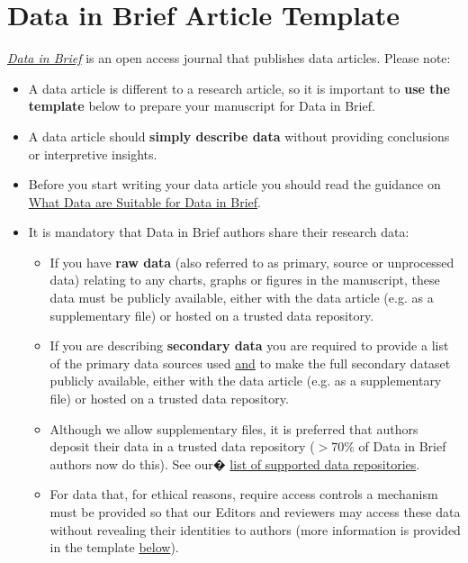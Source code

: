 \documentclass[times,final]{elsarticle.cls}
\begin{document}
\section*{Data in Brief Article Template}
\noindent \href{https://www.journals.elsevier.com/data-in-brief/about-data-in-brief/data-in-brief-faq}%
{\textit{Data in Brief}} 
is an open access journal that publishes data articles.
Please note:
\begin{itemize}
\item A data article is different to a research article, so it is
important to \textbf{use the template} below to prepare your manuscript for Data
in Brief.
\item A data article should \textbf{simply describe data} without providing
conclusions or interpretive insights.
\item Before you start writing your data article you should read the
guidance on 
\href{https://www.journals.elsevier.com/data-in-brief/policies-and-guidelines/what-data-are-suitable-for-data-in-brief}%
{What Data are Suitable for Data in Brief}.
\item It is mandatory that Data in Brief authors share their research data:
\begin{itemize}
\item If you have \textbf{raw data} (also referred to as primary, source or
unprocessed data) relating to any charts, graphs or figures in the
manuscript, these data must be publicly available, either with the data
article (e.g. as a supplementary file) or hosted on a trusted data
repository.

\item If you are describing \textbf{secondary data} you are required to provide
a list of the primary data sources used \underline{and} to make the full secondary
dataset publicly available, either with the data article (e.g. as a
supplementary file) or hosted on a trusted data repository.

\item Although we allow supplementary files, it is preferred that
authors deposit their data in a trusted data repository ($>$70\% of
Data in Brief authors now do this). See our�
\href{https://www.elsevier.com/authors/author-resources/research-data/data-base-linking#repositories}%
{list of supported data repositories}.

\item For data that, for ethical reasons, require access controls a
mechanism must be provided so that our Editors and reviewers may access
these data without revealing their identities to authors (more
information is provided in the template \hyperlink{target1}{below}).
\end{itemize}
\end{itemize}
\end{document}
